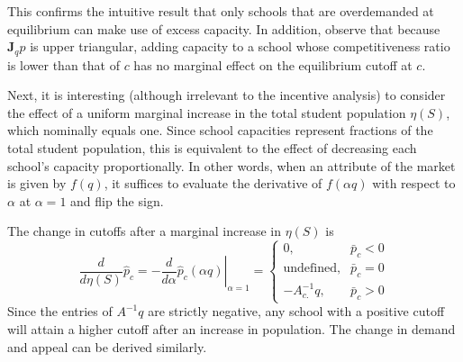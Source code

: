 \documentclass[12pt]{article}
\theoremstyle{definition}
\begin{document}
This confirms the intuitive result that only schools that are overdemanded at equilibrium can make use of excess capacity. In addition, observe that because $\mathbf{J}_q \hat p$ is upper triangular, adding capacity to a school whose competitiveness ratio is lower than that of $c$ has no marginal effect on the equilibrium cutoff at $c$. 

Next, it is interesting (although irrelevant to the incentive analysis) to consider the effect of a uniform marginal increase in the total student population $\eta(S)$, which nominally equals one. Since school capacities represent fractions of the total student population, this is equivalent to the effect of decreasing each school's capacity proportionally. In other words, when an attribute of the market is given by $f(q)$, it suffices to evaluate the derivative of $f(\alpha q)$ with respect to $\alpha$ at $\alpha =1$ and flip the sign.

The change in cutoffs after a marginal increase in $\eta(S)$ is
\begin{equation}\label{d-population-p}
\frac{d}{{d}\eta(S)} \hat p_c = 
- \left.\frac{{d}}{{d}\alpha} \hat p_c(\alpha q)\right|_{\alpha=1} = \begin{cases}
0, & \bar p_c < 0 \\
\text{undefined}, & \bar p_c = 0 \\
-A^{-1}_{c .} q, & \bar p_c > 0
\end{cases}
\end{equation}
Since the entries of $A^{-1}q$ are strictly negative, any school with a positive cutoff will attain a higher cutoff after an increase in population. The change in demand and appeal can be derived similarly. 

\end{document}
